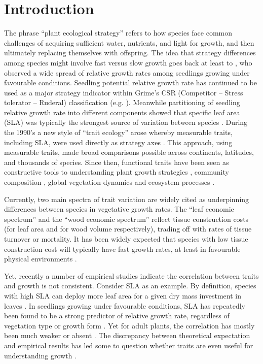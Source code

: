 \documentclass[a4paper,11pt]{article}
\begin{document}
\section*{Introduction}\label{introduction}

The phrase ``plant ecological strategy'' refers to how species face common challenges of acquiring sufficient water, nutrients, and light for growth, and then ultimately replacing themselves with offspring. The idea that strategy differences among species might involve fast versus slow growth goes back at least to \citet{Grime:1975gr}, who observed a wide spread of relative growth rates among seedlings growing under favourable conditions. Seedling potential relative growth rate has continued to be used as a major strategy indicator within Grime's CSR (Competitor -- Stress tolerator -- Ruderal) classification (e.g. \citealt{grime1979plant, Grime:1997wm}). Meanwhile partitioning of seedling relative growth rate into different components showed that specific leaf area (SLA) was typically the strongest source of variation between species \citep{Poorter:1989tx, Rees:2010gk}. During the 1990's a new style of ``trait ecology'' arose whereby measurable traits, including SLA, were used directly as strategy axes \citep{Westoby:2002ft}. This approach, using measurable traits, made broad comparisons possible across continents, latitudes, and thousands of species. Since then, functional traits have been seen as constructive tools to understanding plant growth strategies \citep{Westoby:2002ft}, community composition \citep{Lavorel:2002ff,Shipley:2006ie}, global vegetation dynamics \citep{Scheiter:2013ed} and ecosystem processes \citep{Lavorel:2002ff}.

Currently, two main spectra of trait variation are widely cited as underpinning differences between species in vegetative growth rates. The ``leaf economic spectrum'' \citep{Wright:2004jb} and the ``wood economic spectrum'' \citep{Chave:2009iy} reflect tissue construction costs (for leaf area and for wood volume respectively), trading off with rates of tissue turnover or mortality. It has been widely expected that species with low tissue construction cost will typically have fast growth rates, at least in favourable physical environments \citep[e.g.][]{MullerLandau:2004dc,Poorter:2008iu,Chave:2009iy,Larjavaara:2010bn,Iida:2012jb,Paine:2015df}. 

Yet, recently a number of empirical studies indicate the correlation between traits and growth is not consistent. Consider SLA as an example. By definition, species with high SLA can deploy more leaf area for a given dry mass investment in leaves \citep{Poorter:1999wd, Reich:1992wm}. In seedlings growing under favourable conditions, SLA has repeatedly been found to be a strong predictor of relative growth rate, regardless of vegetation type or growth form \citep{Lambers:1992bj,Reich:1992wm,Grime:1997wm,Poorter:1999wd,Wright:1999ds}. Yet for adult plants, the correlation has mostly been much weaker or absent \citep{coomes_comparison_1998,Poorter:2008iu,Aiba:2009ft,Easdale:2009gv,Wright:2010tp}. The discrepancy between theoretical expectation and empirical results has led some to question whether traits are even useful for understanding growth \citep{Wright:2010tp, Paine:2015df}.
\end{document}

